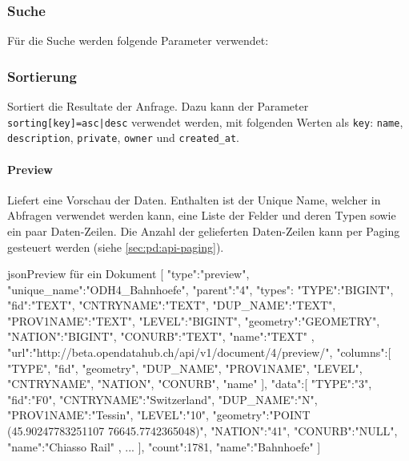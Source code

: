 \subsubsection{Suche} \label{sec:pd:api-search} 
Für die Suche werden folgende Parameter verwendet:

\subsubsection{Sortierung} \label{sec:pd:api-sort}
Sortiert die Resultate der Anfrage. Dazu kann der Parameter \texttt{sorting[key]=asc|desc} verwendet werden, mit folgenden Werten als \texttt{key}: \texttt{name}, \texttt{description}, \texttt{private}, \texttt{owner} und \texttt{created\_at}.

\paragraph{Preview} \label{sec:pd:api-preview}
Liefert eine Vorschau der Daten. Enthalten ist der Unique Name, welcher in Abfragen verwendet werden kann, eine Liste der Felder und deren Typen sowie ein paar Daten-Zeilen. Die Anzahl der gelieferten Daten-Zeilen kann per Paging gesteuert werden (siehe \cref{sec:pd:api-paging}).

\begin{srclst}{json}{Preview für ein Dokument}
[  
   {  
      "type":"preview",
      "unique_name":"ODH4_Bahnhoefe",
      "parent":"4",
      "types":{  
         "TYPE":"BIGINT",
         "fid":"TEXT",
         "CNTRYNAME":"TEXT",
         "DUP_NAME":"TEXT",
         "PROV1NAME":"TEXT",
         "LEVEL":"BIGINT",
         "geometry":"GEOMETRY",
         "NATION":"BIGINT",
         "CONURB":"TEXT",
         "name":"TEXT"
      },
      "url":"http://beta.opendatahub.ch/api/v1/document/4/preview/",
      "columns":[ "TYPE", "fid", "geometry", "DUP_NAME", "PROV1NAME", "LEVEL", "CNTRYNAME", "NATION", "CONURB", "name" ],
      "data":[  
         {  
            "TYPE":"3",
            "fid":"F0",
            "CNTRYNAME":"Switzerland",
            "DUP_NAME":"N",
            "PROV1NAME":"Tessin",
            "LEVEL":"10",
            "geometry":"POINT (45.90247783251107 76645.7742365048)",
            "NATION":"41",
            "CONURB":"NULL",
            "name":"Chiasso Rail"
         },
         ...
      ],
      "count":1781,
      "name":"Bahnhoefe"
   }
]
\end{srclst}

